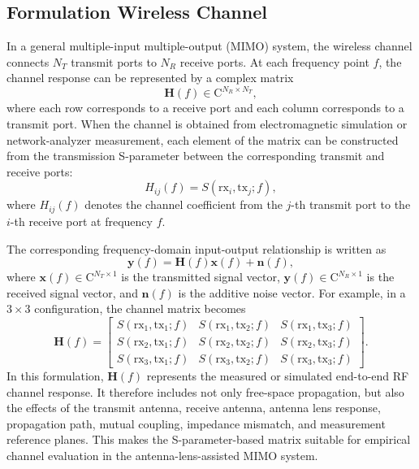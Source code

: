 \subsection{Formulation Wireless Channel}
In a general multiple-input multiple-output (MIMO) system, the wireless channel connects $N_T$ transmit ports to $N_R$ receive ports. At each frequency point $f$, the channel response can be represented by a complex matrix
\begin{equation}
    \mathbf{H}(f) \in \mathrm{C}^{N_R \times N_T},
\end{equation}
where each row corresponds to a receive port and each column corresponds to a transmit port. When the channel is obtained from electromagnetic simulation or network-analyzer measurement, each element of the matrix can be constructed from the transmission S-parameter between the corresponding transmit and receive ports:
\begin{equation}
    H_{ij}(f) = S(\mathrm{rx}_i,\mathrm{tx}_j;f),
\end{equation}
where $H_{ij}(f)$ denotes the channel coefficient from the $j$-th transmit port to the $i$-th receive port at frequency $f$.

The corresponding frequency-domain input-output relationship is written as
\begin{equation}
    \mathbf{y}(f) = \mathbf{H}(f)\mathbf{x}(f) + \mathbf{n}(f),
\end{equation}
where $\mathbf{x}(f)\in\mathrm{C}^{N_T \times 1}$ is the transmitted signal vector, $\mathbf{y}(f)\in\mathrm{C}^{N_R \times 1}$ is the received signal vector, and $\mathbf{n}(f)$ is the additive noise vector. For example, in a $3\times3$ configuration, the channel matrix becomes
\begin{equation}
    \mathbf{H}(f) =
    \begin{bmatrix}
        S(\mathrm{rx}_1,\mathrm{tx}_1;f) & S(\mathrm{rx}_1,\mathrm{tx}_2;f) & S(\mathrm{rx}_1,\mathrm{tx}_3;f) \\
        S(\mathrm{rx}_2,\mathrm{tx}_1;f) & S(\mathrm{rx}_2,\mathrm{tx}_2;f) & S(\mathrm{rx}_2,\mathrm{tx}_3;f) \\
        S(\mathrm{rx}_3,\mathrm{tx}_1;f) & S(\mathrm{rx}_3,\mathrm{tx}_2;f) & S(\mathrm{rx}_3,\mathrm{tx}_3;f)
    \end{bmatrix}.
\end{equation}
In this formulation, $\mathbf{H}(f)$ represents the measured or simulated end-to-end RF channel response. It therefore includes not only free-space propagation, but also the effects of the transmit antenna, receive antenna, antenna lens response, propagation path, mutual coupling, impedance mismatch, and measurement reference planes. This makes the S-parameter-based matrix suitable for empirical channel evaluation in the antenna-lens-assisted MIMO system.

